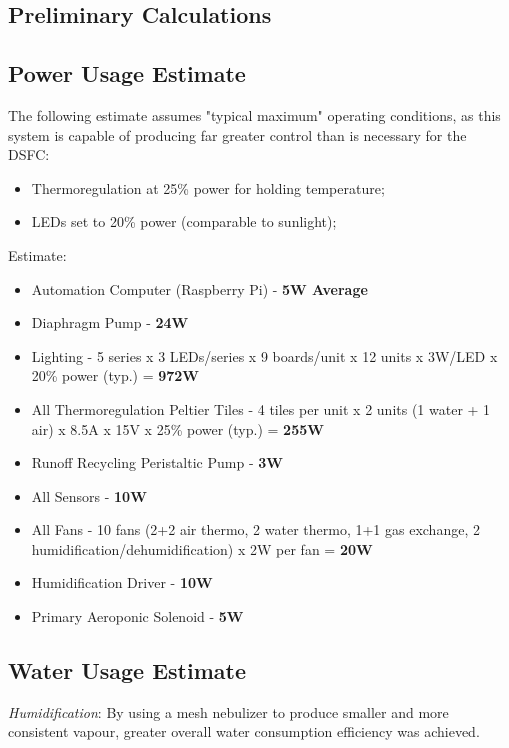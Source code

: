 \documentclass{../tex/report}
\begin{document}
\begin{spacing}{0.5}
\small

\section{Preliminary Calculations}

\subsection{Power Usage Estimate}
\label{app:power}

The following estimate assumes "typical maximum" operating conditions, as this system is capable of producing far greater control than is necessary for the DSFC:
\begin{itemize}
    \item Thermoregulation at 25\% power for holding temperature;
    \item LEDs set to 20\% power (comparable to sunlight);
\end{itemize}

Estimate:
\begin{itemize}
    \item Automation Computer (Raspberry Pi) - \textbf{5W Average}
    \item Diaphragm Pump - \textbf{24W} 
    \item Lighting - 5 series x 3 LEDs/series x 9 boards/unit x 12 units x 3W/LED x 20\% power (typ.) = \textbf{972W}
    \item All Thermoregulation Peltier Tiles - 4 tiles per unit x 2 units (1 water + 1 air) x 8.5A x 15V x 25\% power (typ.) = \textbf{255W}
    \item Runoff Recycling Peristaltic Pump - \textbf{3W}
    \item All Sensors - \textbf{10W}
    \item All Fans - 10 fans (2+2 air thermo, 2 water thermo, 1+1 gas exchange, 2 humidification/dehumidification) x 2W per fan = \textbf{20W}
    \item Humidification Driver - \textbf{10W}
    \item Primary Aeroponic Solenoid - \textbf{5W}
\end{itemize}

\subsection{Water Usage Estimate}
\label{app:water}

\textit{Humidification}: By using a mesh nebulizer to produce smaller and more consistent vapour, greater overall water consumption efficiency was achieved.


\end{spacing}
\end{document}
